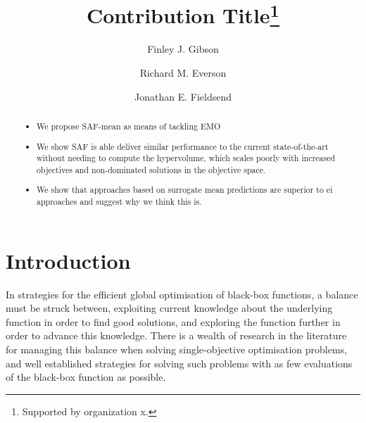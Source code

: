 \documentclass[runningheads]{llncs}
\begin{document}
%
\title{Contribution Title\thanks{Supported by organization x.}}
%

\author{Finley J. Gibson\and
Richard M. Everson\and
Jonathan E. Fieldsend}
%
%
%
\maketitle              %


\begin{abstract}

\begin{itemize}
    \item We propose SAF-mean as means of tackling EMO
    \item We show SAF is able deliver similar performance to the current state-of-the-art without needing to compute the hypervolume, which scales poorly with increased objectives and non-dominated solutions in the objective space.
    \item We show that approaches based on surrogate mean predictions are superior to ei approaches and suggest why we think this is. 
 
\end{itemize}

\end{abstract}
%
%
%
\section{Introduction}
In strategies for the efficient global optimisation of black-box functions, a balance must be struck between, exploiting current knowledge about the underlying function in order to find good solutions, and exploring the function further in order to advance this knowledge. There is a wealth of research in the literature for managing this balance when solving single-objective optimisation problems, and well established strategies for solving such problems with as few evaluations of the black-box function as possible. 
\end{document}
